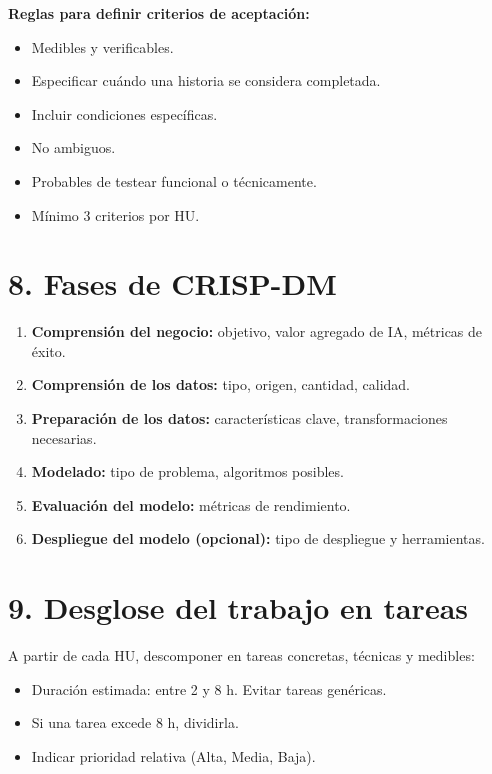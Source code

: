 \documentclass[
11pt, %
]{charter}
\begin{document}
\textbf{Reglas para definir criterios de aceptación:}
\begin{itemize}
  \item Medibles y verificables.
  \item Especificar cuándo una historia se considera completada.
  \item Incluir condiciones específicas.
  \item No ambiguos.
  \item Probables de testear funcional o técnicamente.
  \item Mínimo 3 criterios por HU.
\end{itemize}

\section{8. Fases de CRISP-DM}

\begin{enumerate}
  \item \textbf{Comprensión del negocio:} objetivo, valor agregado de IA, métricas de éxito.
  \item \textbf{Comprensión de los datos:} tipo, origen, cantidad, calidad.
  \item \textbf{Preparación de los datos:} características clave, transformaciones necesarias.
  \item \textbf{Modelado:} tipo de problema, algoritmos posibles.
  \item \textbf{Evaluación del modelo:} métricas de rendimiento.
  \item \textbf{Despliegue del modelo (opcional):} tipo de despliegue y herramientas.
\end{enumerate}

\section{9. Desglose del trabajo en tareas}
\label{sec:wbs}

A partir de cada HU, descomponer en tareas concretas, técnicas y medibles:

\begin{itemize}
  \item Duración estimada: entre 2 y 8 h. Evitar tareas genéricas.
  \item Si una tarea excede 8 h, dividirla.
  \item Indicar prioridad relativa (Alta, Media, Baja).
\end{itemize}
\end{document}
